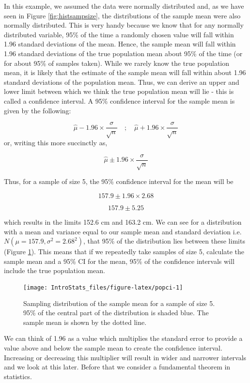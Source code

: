 \documentclass[
  oneside]{krantz}
\begin{document}
In this example, we assumed the data were normally distributed and, as we have seen in Figure \ref{fig:histsampsize}, the distributions of the sample mean were also normally distributed. This is very handy because we know that for any normally distributed variable, 95\% of the time a randomly chosen value will fall within 1.96 standard deviations of the mean. Hence, the sample mean will fall within 1.96 standard deviations of the true population mean about 95\% of the time (or for about 95\% of samples taken). While we rarely know the true population mean, it is likely that the estimate of the sample mean will fall within about 1.96 standard deviations of the population mean. Thus, we can derive an upper and lower limit between which we think the true population mean will lie - this is called a confidence interval. A 95\% confidence interval for the sample mean is given by the following:

\[ \hat \mu - 1.96 \times \frac{\sigma}{\sqrt{n}} \quad ; \quad \hat \mu + 1.96 \times \frac{\sigma}{\sqrt{n}}\]
or, writing this more succinctly as,

\[ \hat \mu \pm 1.96 \times \frac{\sigma}{\sqrt{n}}\]

Thus, for a sample of size 5, the 95\% confidence interval for the mean will be

\[157.9 \pm 1.96 \times 2.68\]

\[157.9 \pm 5.25\]

which results in the limits 152.6 cm and 163.2 cm. We can see for a distribution with a mean and variance equal to our sample mean and standard deviation i.e.~\(N(\mu=157.9, \sigma^2=2.68^2)\), that 95\% of the distribution lies between these limits (Figure \ref{fig:popci}). This means that if we repeatedly take samples of size 5, calculate the sample mean and a 95\% CI for the mean, 95\% of the confidence intervals will include the true population mean.

\begin{figure}

{\centering \texttt{[image: IntroStats\_files/figure-latex/popci-1]} 

}

\caption{Sampling distribution of the sample mean for a sample of size 5. 95\% of the central part of the distribution is shaded blue. The sample mean is shown by the dotted line.}\label{fig:popci}
\end{figure}

We can think of 1.96 as a value which multiplies the standard error to provide a value above and below the sample mean to create the confidence interval. Increasing or decreasing this multiplier will result in wider and narrower intervals and we look at this later. Before that we consider a fundamental theorem in statistics.
\end{document}
